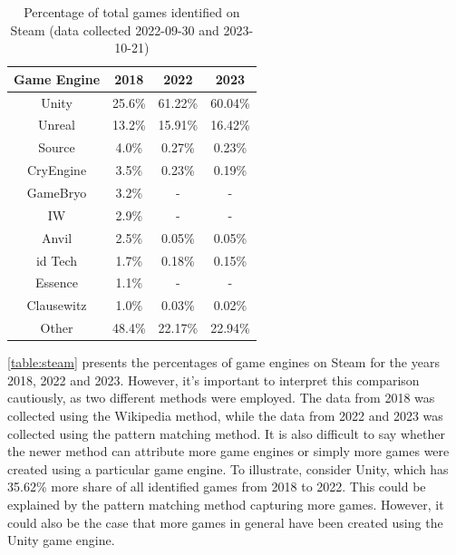 \begin{table}[h!]
    \centering
    \begin{tabular}{|c c c c|}
        \hline
        Game Engine & 2018   & 2022    & 2023    \\
        \hline\hline
        Unity       & 25.6\% & 61.22\% & 60.04\% \\
        Unreal      & 13.2\% & 15.91\% & 16.42\% \\
        Source      & 4.0\%  & 0.27\%  & 0.23\%  \\
        CryEngine   & 3.5\%  & 0.23\%  & 0.19\%  \\
        GameBryo    & 3.2\%  & -       & -       \\
        IW          & 2.9\%  & -       & -       \\
        Anvil       & 2.5\%  & 0.05\%  & 0.05\%  \\
        id Tech     & 1.7\%  & 0.18\%  & 0.15\%  \\
        Essence     & 1.1\%  & -       & -       \\
        Clausewitz  & 1.0\%  & 0.03\%  & 0.02\%  \\
        Other       & 48.4\% & 22.17\% & 22.94\% \\
        \hline
    \end{tabular}
    \caption{Percentage of total games identified on Steam (data collected 2022-09-30 and 2023-10-21)}
    \label{table:steam}
\end{table}

\autoref{table:steam} presents the percentages of game engines on Steam for the years 2018, 2022 and 2023.
However, it's important to interpret this comparison cautiously, as two different methods were employed.
The data from 2018 was collected using the Wikipedia method, while the data from 2022 and 2023 was collected using the pattern matching method.
It is also difficult to say whether the newer method can attribute more game engines or simply more games were created using a particular game engine.
To illustrate, consider Unity, which has 35.62\% more share of all identified games from 2018 to 2022.
This could be explained by the pattern matching method capturing more games.
However, it could also be the case that more games in general have been created using the Unity game engine.\\

